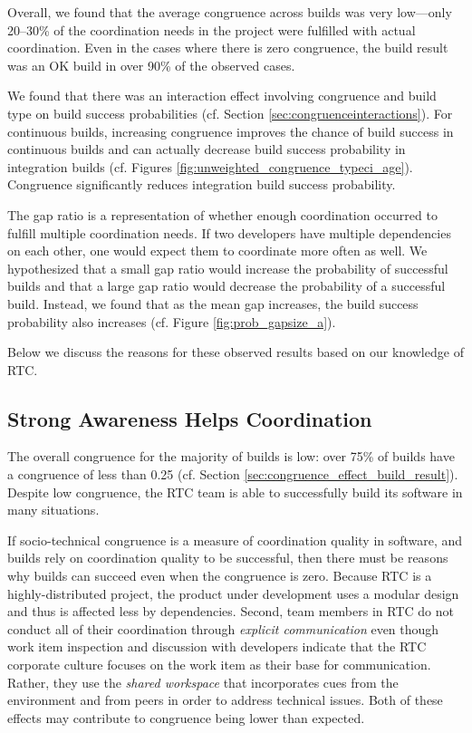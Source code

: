 Overall, we found that the average congruence across builds was very low---only 20--30\% of the coordination needs in the project were fulfilled with actual coordination. Even in the cases where there is zero congruence, the build result was an OK build in over 90\% of the observed cases.

We found that there was an interaction effect involving congruence and build type on build success probabilities (cf. Section \ref{sec:congruenceinteractions}). For continuous builds, increasing congruence improves the chance of build success in continuous builds and can actually decrease build success probability in integration builds (cf. Figures \ref{fig:unweighted_congruence_typeci_age}). Congruence significantly reduces integration build success probability.

The gap ratio is a representation of whether enough coordination
occurred to fulfill multiple coordination needs. If two developers have multiple dependencies on each other, one would expect them to
coordinate more often as well.
We hypothesized that a small gap ratio would increase the probability of successful builds and that a large gap ratio would decrease the probability of a successful build. Instead, we found that as the mean gap increases, the build success probability also increases (cf. Figure \ref{fig:prob_gapsize_a}).

Below we discuss the reasons for these observed results based on our knowledge of RTC.

\subsection{Strong Awareness Helps Coordination}
The overall congruence for the majority of builds is low: over 75\% of
builds have a congruence of less than 0.25 (cf. Section \ref{sec:congruence_effect_build_result}).
Despite low congruence, the RTC team is able to successfully build its software in many situations.


If socio-technical congruence is a measure of coordination quality in software, and builds rely on coordination quality to be successful, then there must be reasons why builds can succeed even when the congruence is zero.
Because RTC is a highly-distributed project, the product under development uses a modular design \cite{maccormack2006} and thus is affected less by dependencies. Second, team members in RTC do not conduct all of their coordination through \emph{explicit communication} even though work item inspection and discussion with developers indicate that the RTC corporate culture focuses on the work item as their base for communication. Rather, they use the \emph{shared workspace} that incorporates cues from the environment and from peers in order to address technical issues. Both of these effects may contribute to congruence being lower than expected.

